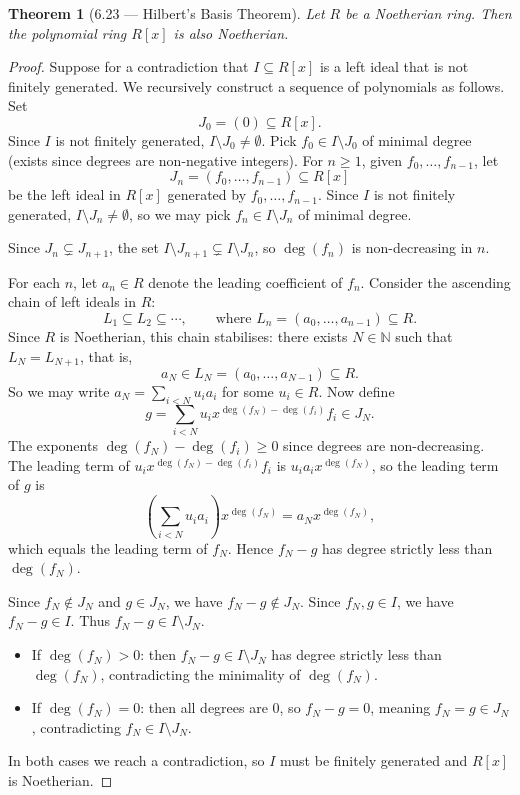 \documentclass[12pt]{article}
\newtheorem{theorem}{Theorem}
\begin{document}
\begin{theorem}[6.23 — Hilbert's Basis Theorem]
Let $R$ be a Noetherian ring. Then the polynomial ring $R[x]$ is also Noetherian.
\end{theorem}

\begin{proof}
Suppose for a contradiction that $I \subseteq R[x]$ is a left ideal that is not finitely generated. We recursively construct a sequence of polynomials as follows. Set
\[
  J_0 = (0) \subseteq R[x].
\]
Since $I$ is not finitely generated, $I \setminus J_0 \neq \emptyset$. Pick $f_0 \in I \setminus J_0$ of minimal degree (exists since degrees are non-negative integers). For $n \geq 1$, given $f_0, \ldots, f_{n-1}$, let
\[
  J_n = (f_0, \ldots, f_{n-1}) \subseteq R[x]
\]
be the left ideal in $R[x]$ generated by $f_0, \ldots, f_{n-1}$. Since $I$ is not finitely generated, $I \setminus J_n \neq \emptyset$, so we may pick $f_n \in I \setminus J_n$ of minimal degree.

Since $J_n \subsetneq J_{n+1}$, the set $I \setminus J_{n+1} \subsetneq I \setminus J_n$, so $\deg(f_n)$ is non-decreasing in $n$.

For each $n$, let $a_n \in R$ denote the leading coefficient of $f_n$. Consider the ascending chain of left ideals in $R$:
\[
  L_1 \subseteq L_2 \subseteq \cdots, \qquad \text{where } L_n = (a_0, \ldots, a_{n-1}) \subseteq R.
\]
Since $R$ is Noetherian, this chain stabilises: there exists $N \in \mathbb{N}$ such that $L_N = L_{N+1}$, that is,
\[
  a_N \in L_N = (a_0, \ldots, a_{N-1}) \subseteq R.
\]
So we may write $a_N = \sum_{i < N} u_i a_i$ for some $u_i \in R$. Now define
\[
  g = \sum_{i < N} u_i x^{\deg(f_N) - \deg(f_i)} f_i \in J_N.
\]
The exponents $\deg(f_N) - \deg(f_i) \geq 0$ since degrees are non-decreasing. The leading term of $u_i x^{\deg(f_N)-\deg(f_i)} f_i$ is $u_i a_i x^{\deg(f_N)}$, so the leading term of $g$ is
\[
  \left(\sum_{i<N} u_i a_i\right) x^{\deg(f_N)} = a_N x^{\deg(f_N)},
\]
which equals the leading term of $f_N$. Hence $f_N - g$ has degree strictly less than $\deg(f_N)$.

Since $f_N \notin J_N$ and $g \in J_N$, we have $f_N - g \notin J_N$. Since $f_N, g \in I$, we have $f_N - g \in I$. Thus $f_N - g \in I \setminus J_N$.

\begin{itemize}
  \item If $\deg(f_N) > 0$: then $f_N - g \in I \setminus J_N$ has degree strictly less than $\deg(f_N)$, contradicting the minimality of $\deg(f_N)$.
  \item If $\deg(f_N) = 0$: then all degrees are $0$, so $f_N - g = 0$, meaning $f_N = g \in J_N$, contradicting $f_N \in I \setminus J_N$.
\end{itemize}

In both cases we reach a contradiction, so $I$ must be finitely generated and $R[x]$ is Noetherian.
\end{proof}
\end{document}
